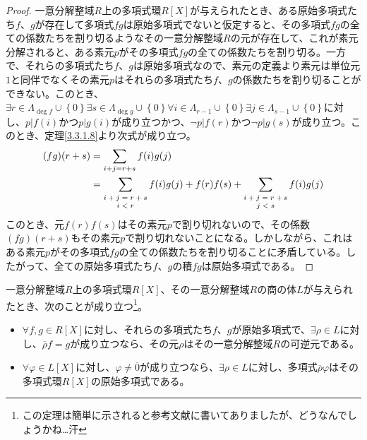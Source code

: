 \documentclass[dvipdfmx]{jsarticle}
\begin{document}
\begin{proof}
一意分解整域$R$上の多項式環$R[ X]$が与えられたとき、ある原始多項式たち$f$、$g$が存在して多項式$fg$は原始多項式でないと仮定すると、その多項式$fg$の全ての係数たちを割り切るようなその一意分解整域$R$の元が存在して、これが素元分解されると、ある素元$p$がその多項式$fg$の全ての係数たちを割り切る。一方で、それらの多項式たち$f$、$g$は原始多項式なので、素元の定義より素元は単位元$1$と同伴でなくその素元$p$はそれらの多項式たち$f$、$g$の係数たちを割り切ることができない。このとき、$\exists r \in \varLambda_{\deg f} \cup \left\{ 0 \right\}\exists s \in \varLambda_{\deg g} \cup \left\{ 0 \right\}\forall i \in \varLambda_{r - 1} \cup \left\{ 0 \right\}\exists j \in \varLambda_{s - 1} \cup \left\{ 0 \right\}$に対し、$p|f(i)$かつ$p|g(i)$が成り立つかつ、$\neg p|f(r)$かつ$\neg p|g(s)$が成り立つ。このとき、定理\ref{3.3.1.8}より次式が成り立つ。
\begin{align*}
(fg)(r + s) &= \sum_{i + j = r + s} {f(i)g(j)} \\
&= \sum_{\scriptsize \begin{matrix} i + j = r + s \\ i < r \end{matrix}} {f(i)g(j)} + f(r)f(s) + \sum_{\scriptsize \begin{matrix} i + j = r + s \\ j < s \end{matrix}} {f(i)g(j)}
\end{align*}
このとき、元$f(r)f(s)$はその素元$p$で割り切れないので、その係数$(fg)(r + s)$もその素元$p$で割り切れないことになる。しかしながら、これはある素元$p$がその多項式$fg$の全ての係数たちを割り切ることに矛盾している。したがって、全ての原始多項式たち$f$、$g$の積$fg$は原始多項式である。
\end{proof}
\begin{thm}\label{3.3.5.10}
一意分解整域$R$上の多項式環$R[ X]$、その一意分解整域$R$の商の体$L$が与えられたとき、次のことが成り立つ\footnote{この定理は簡単に示されると参考文献に書いてありましたが、どうなんでしょうかね…汗}。
\begin{itemize}
\item
  $\forall f,g \in R[ X]$に対し、それらの多項式たち$f$、$g$が原始多項式で、$\exists\rho \in L$に対し、$\overline{\rho}f = g$が成り立つなら、その元$\rho$はその一意分解整域$R$の可逆元である。
\item
  $\forall\varphi \in L[ X]$に対し、$\varphi \neq \overline{0}$が成り立つなら、$\exists\rho \in L$に対し、多項式$\overline{\rho}\varphi$はその多項式環$R[ X]$の原始多項式である。
\end{itemize}
\end{thm}
\end{document}
